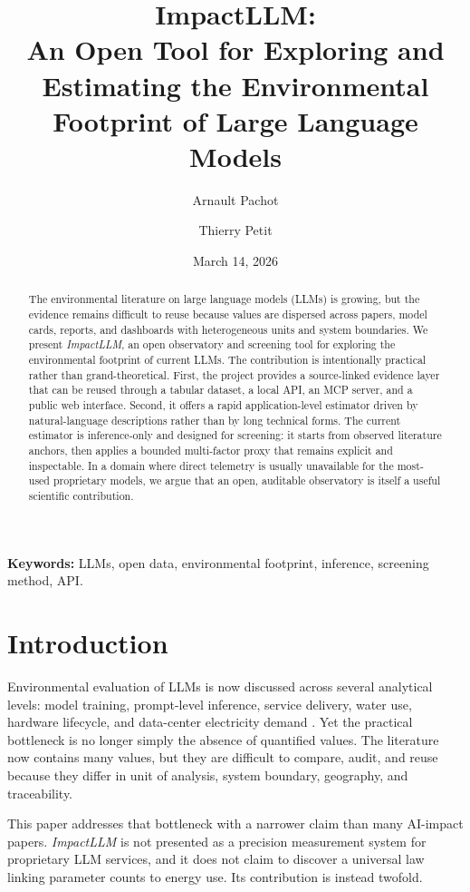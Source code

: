 \documentclass[10pt,a4paper]{article}
\title{ImpactLLM:\\An Open Tool for Exploring and Estimating the Environmental Footprint of Large Language Models}
\author{Arnault Pachot \and Thierry Petit}
\date{March 14, 2026}
\begin{document}
\maketitle

\begin{abstract}
The environmental literature on large language models (LLMs) is growing, but the evidence remains difficult to reuse because values are dispersed across papers, model cards, reports, and dashboards with heterogeneous units and system boundaries. We present \emph{ImpactLLM}, an open observatory and screening tool for exploring the environmental footprint of current LLMs. The contribution is intentionally practical rather than grand-theoretical. First, the project provides a source-linked evidence layer that can be reused through a tabular dataset, a local API, an MCP server, and a public web interface. Second, it offers a rapid application-level estimator driven by natural-language descriptions rather than by long technical forms. The current estimator is inference-only and designed for screening: it starts from observed literature anchors, then applies a bounded multi-factor proxy that remains explicit and inspectable. In a domain where direct telemetry is usually unavailable for the most-used proprietary models, we argue that an open, auditable observatory is itself a useful scientific contribution.
\end{abstract}

\textbf{Keywords:} LLMs, open data, environmental footprint, inference, screening method, API.

\section{Introduction}
Environmental evaluation of LLMs is now discussed across several analytical levels: model training, prompt-level inference, service delivery, water use, hardware lifecycle, and data-center electricity demand \cite{strubell2019,rillig2023,luccioni2023,ren2024,morrison2025,elsworth2025,li2025water,iea2025}. Yet the practical bottleneck is no longer simply the absence of quantified values. The literature now contains many values, but they are difficult to compare, audit, and reuse because they differ in unit of analysis, system boundary, geography, and traceability.

This paper addresses that bottleneck with a narrower claim than many AI-impact papers. \emph{ImpactLLM} is not presented as a precision measurement system for proprietary LLM services, and it does not claim to discover a universal law linking parameter counts to energy use. Its contribution is instead twofold.
\end{document}
